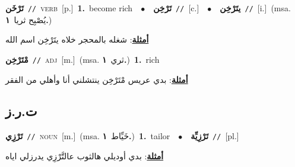 \documentclass[10pt,a4paper,twoside]{article} %
\begin{document}
\begin{multicols}{2}
{\setlength\topsep{0pt}\textbf{\foreignlanguage{arabic}{تَرْخَن}}\ {\color{gray}\texttt{//}\color{black}}\ \textsc{verb}\ [p.]\ \textbf{1.}~become rich\ \ $\bullet$\ \ \setlength\topsep{0pt}\textbf{\foreignlanguage{arabic}{تَرْخِن}}\ {\color{gray}\texttt{//}\color{black}}\ [c.]\ \ $\bullet$\ \ \setlength\topsep{0pt}\textbf{\foreignlanguage{arabic}{يتَرْخِن}}\ {\color{gray}\texttt{//}\color{black}}\ [i.]\ \color{gray}(msa. \foreignlanguage{arabic}{يُصْبِح ثريا}~\foreignlanguage{arabic}{\textbf{١.}})\color{black}\  \begin{flushright}\color{gray}\foreignlanguage{arabic}{\textbf{\underline{\foreignlanguage{arabic}{أمثلة}}}: شغله بالمحجر خلاه يتَرْخِن اسم الله}\end{flushright}\color{black}} \vspace{2mm}

{\setlength\topsep{0pt}\textbf{\foreignlanguage{arabic}{مْتَرْخِن}}\ {\color{gray}\texttt{//}\color{black}}\ \textsc{adj}\ [m.]\ \color{gray}(msa. \foreignlanguage{arabic}{ثري}~\foreignlanguage{arabic}{\textbf{١.}})\color{black}\ \textbf{1.}~rich\  \begin{flushright}\color{gray}\foreignlanguage{arabic}{\textbf{\underline{\foreignlanguage{arabic}{أمثلة}}}: بدي عريس مْتَرْخِن ينتشلني أنا وأهلي من الفقر}\end{flushright}\color{black}} \vspace{2mm}

\vspace{-3mm}
\subsection*{\color{blue}\foreignlanguage{arabic}{ت.ر.ز}\color{blue}{}} 

{\setlength\topsep{0pt}\textbf{\foreignlanguage{arabic}{تَرْزِي}}\ {\color{gray}\texttt{//}\color{black}}\ \textsc{noun}\ [m.]\ \color{gray}(msa. \foreignlanguage{arabic}{خَيِّاط}~\foreignlanguage{arabic}{\textbf{١.}})\color{black}\ \textbf{1.}~tailor\ \ $\bullet$\ \ \setlength\topsep{0pt}\textbf{\foreignlanguage{arabic}{تَرْزِيِّة}}\ {\color{gray}\texttt{//}\color{black}}\ [pl.]\  \begin{flushright}\color{gray}\foreignlanguage{arabic}{\textbf{\underline{\foreignlanguage{arabic}{أمثلة}}}: بدي أوديلي هالثوب عالتَّرْزِي يدرزلي اياه}\end{flushright}\color{black}} \vspace{2mm}


\end{multicols}
\end{document}
